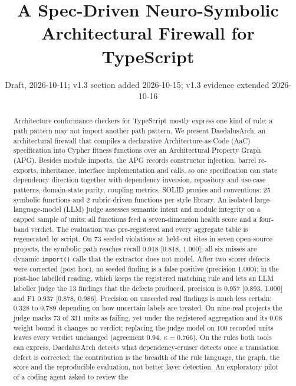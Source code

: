 \documentclass[10pt,a4paper]{article}
\title{A Spec-Driven Neuro-Symbolic Architectural Firewall for TypeScript}
\author{\todo{author list and affiliations}}
\date{Draft, 2026-10-11; v1.3 section added 2026-10-15; v1.3 evidence extended 2026-10-16}
\newcommand{\tool}{DaedalusArch}
\newcommand{\dc}{dependency-cruiser}
\begin{document}
\maketitle

\begin{abstract}
Architecture conformance checkers for TypeScript mostly express one kind of rule: a path pattern may not import
another path pattern. We present \tool{}, an architectural firewall that compiles a declarative
Architecture-as-Code (AaC) specification into Cypher fitness functions over an Architectural Property Graph (APG).
Besides module imports, the APG records constructor injection, barrel re-exports, inheritance, interface
implementation and calls, so one specification can state dependency direction together with dependency inversion,
repository and use-case patterns, domain-state purity, coupling metrics, SOLID proxies and conventions: 25
symbolic functions and 2 rubric-driven functions per style library. An isolated large-language-model (LLM) judge
assesses semantic intent and module integrity on a capped sample of units; all functions feed a seven-dimension
health score and a four-band verdict. The evaluation was pre-registered and every aggregate table is regenerated by
script. On 73 seeded violations at held-out sites in seven open-source projects, the symbolic path reaches recall
0.918 [0.818, 1.000]; all six misses are dynamic \texttt{import()} calls that the extractor does not model. After
two scorer defects were corrected (post hoc), no seeded finding is a false positive (precision 1.000); in the
post-hoc labelled reading, which keeps the registered matching rule and lets an LLM labeller judge the 13 findings
that the defects produced, precision is 0.957 [0.893, 1.000] and F1 0.937 [0.878, 0.986]. Precision on unseeded
real findings is much less certain: 0.328 to 0.789 depending on how uncertain labels are treated. On nine real
projects the judge marks 73 of 331 units as failing, yet under the registered aggregation and its 0.08 weight bound
it changes no verdict; replacing the judge model on 100 recorded units leaves every verdict unchanged
(agreement 0.94, $\kappa = 0.766$). On the rules both tools can express, \tool{} detects what \dc{} detects once a
translation defect is corrected; the contribution is the breadth of the rule language, the graph, the score and the
reproducible evaluation, not better layer detection. An exploratory pilot of a coding agent asked to review the

\end{abstract}
\end{document}
